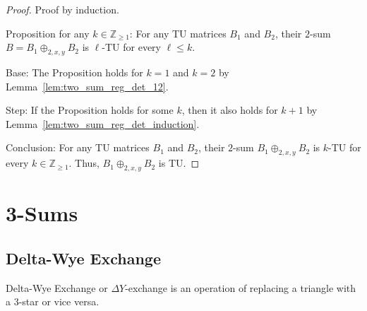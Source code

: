 \documentclass{article}
\theoremstyle{definition}
\begin{document}
\begin{proof}
    Proof by induction.

    Proposition for any $k \in \mathbb{Z}_{\geq 1}$: For any TU matrices $B_{1}$ and $B_{2}$, their $2$-sum $B = B_{1} \oplus_{2, x, y} B_{2}$ is $\ell$-TU for every $\ell \leq k$.

    Base: The Proposition holds for $k = 1$ and $k = 2$ by Lemma~\ref{lem:two_sum_reg_det_12}.

    Step: If the Proposition holds for some $k$, then it also holds for $k + 1$ by Lemma~\ref{lem:two_sum_reg_det_induction}.

    Conclusion: For any TU matrices $B_{1}$ and $B_{2}$, their $2$-sum $B_{1} \oplus_{2, x, y} B_{2}$ is $k$-TU for every $k \in \mathbb{Z}_{\geq 1}$. Thus, $B_{1} \oplus_{2, x, y} B_{2}$ is TU.
\end{proof}


\section{3-Sums}

\subsection{Delta-Wye Exchange}

Delta-Wye Exchange or $\Delta Y$-exchange is an operation of replacing a triangle with a 3-star or vice versa.
\end{document}
